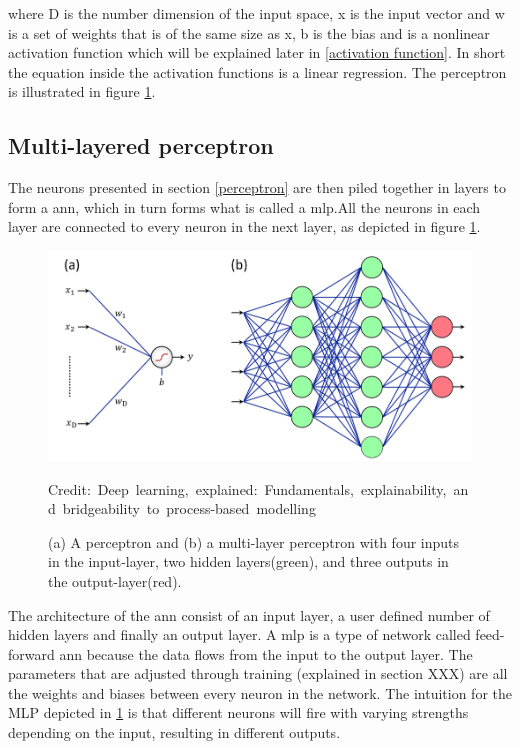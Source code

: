         where D is the number dimension of the input space, x is the input vector and w is a set of weights that is of the same size as x, b is the bias and {\textsigma} is a nonlinear activation function which will be explained later in \ref{activation function}. In short the equation inside the activation functions is a linear regression. The perceptron is illustrated in figure \ref{Perceptron / MLP}.
    
    \subsection{Multi-layered perceptron} \label{MLP}
        The neurons presented in section \ref{perceptron} are then piled together in layers to form a \gls{ann}, which in turn forms what is called a \gls{mlp}.All the neurons in each layer are connected to every neuron in the next layer, as depicted in figure \ref{Perceptron / MLP}.
        
            \begin{figure}[H]
                \centering
                \includegraphics[scale=0.5]{figures/perceptron.png}
                \caption{(a) A perceptron and (b) a multi-layer perceptron with four inputs in the input-layer, two hidden layers(green), and three outputs in the output-layer(red).}
              	\medskip 
            	\hspace*{15pt}\hbox{\scriptsize Credit: Deep learning, explained: Fundamentals, explainability, and bridgeability
        to process-based modelling\cite{razavi2021deep_exp_DL}}
                \label{Perceptron / MLP}
            \end{figure}
        
        The architecture of the \gls{ann} consist of an input layer, a user defined number of hidden layers and finally an output layer. A \gls{mlp} is a type of network called feed-forward \gls{ann} because the data flows from the input to the output layer. The parameters that are adjusted through training (explained in section XXX) are all the weights and biases between every neuron in the network. The intuition for the MLP depicted in \ref{Perceptron / MLP} is that different neurons will fire with varying strengths depending on the input, resulting in different outputs.
        
